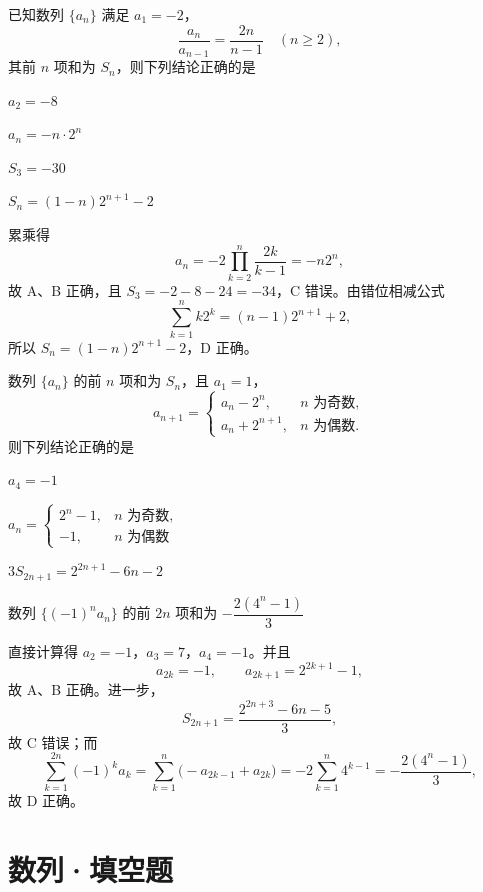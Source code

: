 \documentclass[zihao=-4]{exam-zh}
\begin{document}
\begin{question}[points=6]
已知数列 $\{a_n\}$ 满足 $a_1=-2$，
\[
 \frac{a_n}{a_{n-1}}=\frac{2n}{n-1}\quad(n\ge2),
\]
其前 $n$ 项和为 $S_n$，则下列结论正确的是 \paren[ABD]
\begin{choices}
  \item $a_2=-8$
  \item $a_n=-n\cdot2^n$
  \item $S_3=-30$
  \item $S_n=(1-n)2^{n+1}-2$
\end{choices}
\begin{solution}
累乘得
\[
 a_n=-2\prod_{k=2}^{n}\frac{2k}{k-1}=-n2^n,
\]
故 A、B 正确，且 $S_3=-2-8-24=-34$，C 错误。由错位相减公式
\[
 \sum_{k=1}^{n}k2^k=(n-1)2^{n+1}+2,
\]
所以 $S_n=(1-n)2^{n+1}-2$，D 正确。
\end{solution}
\end{question}

\begin{question}[points=6]
数列 $\{a_n\}$ 的前 $n$ 项和为 $S_n$，且 $a_1=1$，
\[
 a_{n+1}=\begin{cases}
 a_n-2^n,&n\text{ 为奇数},\\
 a_n+2^{n+1},&n\text{ 为偶数}.
 \end{cases}
\]
则下列结论正确的是 \paren[ABD]
\begin{choices}
  \item $a_4=-1$
  \item $a_n=\begin{cases}2^n-1,&n\text{ 为奇数},\\-1,&n\text{ 为偶数}
  \end{cases}$
  \item $3S_{2n+1}=2^{2n+1}-6n-2$
  \item 数列 $\{(-1)^na_n\}$ 的前 $2n$ 项和为 $-\dfrac{2(4^n-1)}3$
\end{choices}
\begin{solution}
直接计算得 $a_2=-1$，$a_3=7$，$a_4=-1$。并且
\[
 a_{2k}=-1,\qquad a_{2k+1}=2^{2k+1}-1,
\]
故 A、B 正确。进一步，
\[
 S_{2n+1}=\frac{2^{2n+3}-6n-5}{3},
\]
故 C 错误；而
\[
 \sum_{k=1}^{2n}(-1)^ka_k
 =\sum_{k=1}^{n}\bigl(-a_{2k-1}+a_{2k}\bigr)
 =-2\sum_{k=1}^{n}4^{k-1}
 =-\frac{2(4^n-1)}3,
\]
故 D 正确。
\end{solution}
\end{question}

\section{数列·填空题}
\end{document}
